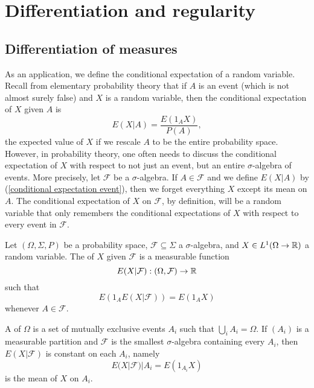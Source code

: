 \chapter{Differentiation and regularity}


\section{Differentiation of measures}

As an application, we define the conditional expectation of a random variable.
Recall from elementary probability theory that if $A$ is an event (which is not almost surely false) and $X$ is a random variable, then the conditional expectation of $X$ given $A$ is
\begin{equation}\label{conditional expectation event}
E(X|A) = \frac{E(1_{A}X)}{P(A)},
\end{equation}
the expected value of $X$ if we rescale $A$ to be the entire probability space.
However, in probability theory, one often needs to discuss the conditional expectation of $X$ with respect to not just an event, but an entire $\sigma$-algebra of events.
More precisely, let $\mathcal F$ be a $\sigma$-algebra.
If $A \in \mathcal F$ and we define $E(X|A)$ by (\ref{conditional expectation event}), then we forget everything $X$ except its mean on $A$.
The conditional expectation of $X$ on $\mathcal F$, by definition, will be a random variable that only remembers the conditional expectations of $X$ with respect to every event in $\mathcal F$.

\begin{definition}
Let $(\Omega, \Sigma, P)$ be a probability space, $\mathcal F \subseteq \Sigma$ a $\sigma$-algebra, and $X \in L^{1}(\Omega \to \mathbb{R})$ a random variable.
The  of $X$ given $\mathcal F$ is a measurable function
\[E(X|\mathcal F): (\Omega, \mathcal F) \to \mathbb{R}\]
such that
\[E(1_{A} E(X|\mathcal F)) = E(1_{A} X)\]
whenever $A \in \mathcal F$.
\end{definition}

\begin{example}
A  of $\Omega$ is a set of mutually exclusive events $A_{i}$ such that $\bigcup_{i} A_{i} = \Omega$.
If $(A_{i})$ is a measurable partition and $\mathcal F$ is the smallest $\sigma$-algebra containing every $A_{i}$, then $E(X|\mathcal F)$ is constant on each $A_{i}$, namely
\[E(X|\mathcal F)|A_{i} = E(1_{A_{i}} X)\]
is the mean of $X$ on $A_{i}$.
\end{example}

